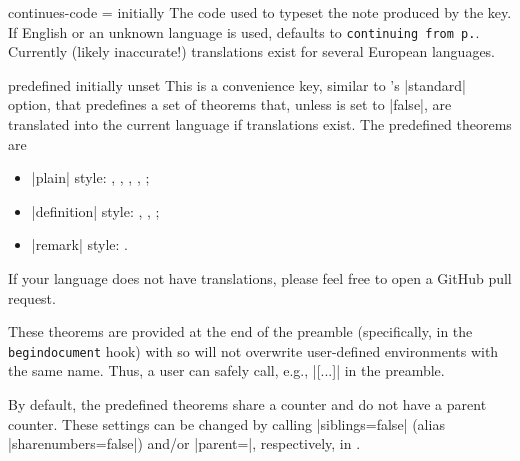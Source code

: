 \documentclass{ltxdoc}
\makeatletter
\newcommand{\hook}{\texttt}
\newcommand{\ttbraces}[1]{\braces{\texttt{#1}}}
\newcommand{\TCBkeydescnewline@aux}{ %
  \xpatchcmd{\__tcobox_doc_head_key:}
    {( \tl_use:N \g__tcobox_doc_description_tl}
    {\\[1ex] ( \tl_use:N \g__tcobox_doc_description_tl}
    {}{}
  }
\newcommand{\TCBkeydescnewline}{\ExplSyntaxOn\TCBkeydescnewline@aux\ExplSyntaxOff}
\makeatother
\begin{document}
\begin{docKey}[][before upper=\TCBkeydescnewline]{continues-code}
  {=}
  {initially \ttbraces{keythms\string_continues}\ttbraces{\#1}}
The code used to typeset the note produced by the  key.
If English or an unknown language is used, defaults to \texttt{continuing from p.}\cs{,}\ttbraces{\#1}.
Currently (likely inaccurate!) translations exist for several European languages.
\end{docKey}

\begin{docKey}{predefined}
  {}
  {initially unset}
This is a convenience key, similar to 's |standard| option, that predefines a set of theorems that, unless  is set to |false|, are translated into the current language if translations exist.
The predefined theorems are
\begin{itemize}
  \item |plain| style: , , , , ;
  \item |definition| style: , , ;
  \item |remark| style: .
\end{itemize}
If your language does not have translations, please feel free to open a GitHub pull request.

These theorems are provided at the end of the preamble (specifically, in the \hook{begindocument} hook) with  so will not overwrite user-defined environments with the same name.
Thus, a user can safely call, e.g., |[...]| in the preamble.

By default, the predefined theorems share a counter and do not have a parent counter.
These settings can be changed by calling |siblings=false| (alias |sharenumbers=false|) and/or |parent=|, respectively, in .

\begin{dispListing}
\usepackage[
  predefined={parent=section}
  ]{keytheorems}

\usepackage{keytheorems}
\end{dispListing}
\end{docKey}
\end{document}
